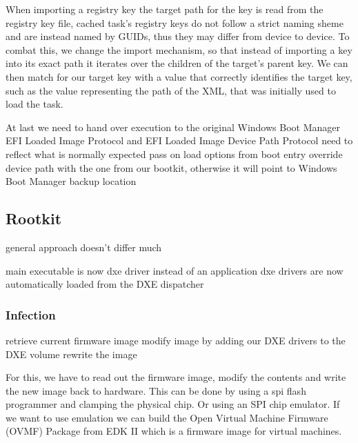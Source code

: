 

When importing a registry key the target path for the key is read from the registry key file, cached task's registry keys do not follow a strict naming sheme and are instead named by GUIDs, thus they may differ from device to device. To combat this, we change the import mechanism, so that instead of importing a key into its exact path it iterates over the children of the target's parent key. We can then match for our target key with a value that correctly identifies the target key, such as the value representing the path of the XML, that was initially used to load the task.

At last we need to hand over execution to the original Windows Boot Manager
EFI Loaded Image Protocol \cite[9.1]{uefi-spec} and EFI Loaded Image Device Path Protocol \cite[9.2]{uefi-spec}
need to reflect what is normally expected
pass on load options from boot entry
override device path with the one from our bootkit, otherwise it will point to Windows Boot Manager backup location


\subsection{Rootkit}

general approach doesn't differ much

main executable is now dxe driver instead of an application
dxe drivers are now automatically loaded from the DXE dispatcher

\subsubsection{Infection}

retrieve current firmware image
modify image by adding our DXE drivers to the DXE volume
rewrite the image

For this, we have to read out the firmware image, modify the contents and write the new image back to hardware. This can be done by using a spi flash programmer and clamping the physical chip. Or using an SPI chip emulator. 
If we want to use emulation we can build the Open Virtual Machine Firmware (OVMF) Package from EDK II which is a firmware image for virtual machines.

